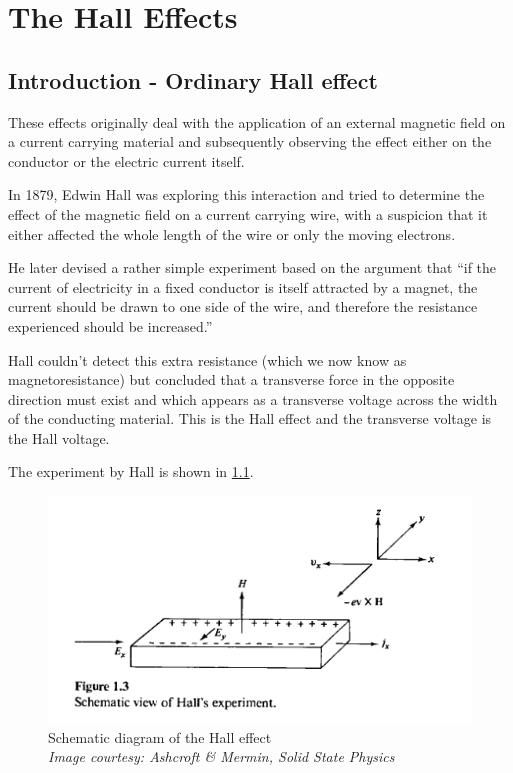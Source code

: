 \chapter{The Hall Effects}

\label{chapter2}

\section{Introduction - Ordinary Hall effect} \label{sec:ohe}

These effects originally deal with the application of an external magnetic field on a current carrying material and subsequently observing the effect either on the conductor or the electric current itself.

In 1879, Edwin Hall was exploring this interaction and tried to determine the effect of the magnetic field on a current carrying wire, with a suspicion that it either affected the whole length of the wire or only the moving electrons.

He later devised a rather simple experiment based on the argument that ``if the current of electricity in a fixed conductor is itself attracted by a magnet, the current should be drawn to one side of the wire, and therefore the resistance experienced should be increased.'' \cite{S.1880}

Hall couldn't detect this extra resistance (which we now know as magnetoresistance) but concluded that a transverse force in the opposite direction must exist and which appears as a transverse voltage across the width of the conducting material.
This is the Hall effect and the transverse voltage is the Hall voltage.

The experiment by Hall is shown in \cref{hall-figure}.

\begin{figure}[h!]
    \centering
    \includegraphics[width=0.7\columnwidth]{hall-effect-ashcroft.png}
    \caption{Schematic diagram of the Hall effect\\ \textit{Image courtesy: Ashcroft \& Mermin, Solid State Physics}}
    \label{hall-figure}
\end{figure}


